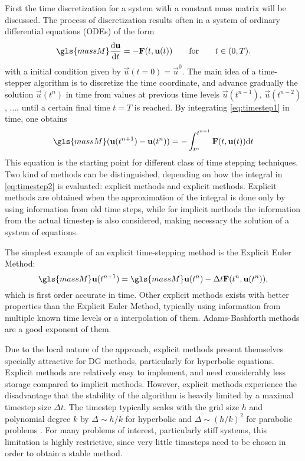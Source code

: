 First the time discretization for a system with a constant mass matrix will be discussed. The process of discretization results often in a system of ordinary differential equations (ODEs) of the form
\begin{equation}
\gls{massM}\frac{\text{d}\vec{u}}{\text{d}t} = - \vec{F}(t,\vec{u}(t))\qquad \text{for}\qquad t \in (0,T).\label{eq:timestep1}
\end{equation}
with a initial condition given by $\vec{u}(t=0) = \vec{u}^0$. The main idea of a time-stepper algorithm is to discretize the time coordinate, and advance gradually the solution $\vec{u}(t^n)$ in time from values at previous time levels $\vec{u}(t^{n-1})$, $\vec{u}(t^{n-2})$, $\dots$,  until a certain final time $t = T$ is reached.
By integrating \cref{eq:timestep1} in time, one obtains
\begin{equation}
\gls{massM}(\vec{u}(t^{n+1})-\vec{u}(t^{n})) = - \int_{t^n}^{t^{n+1}}\vec{F}(t,\vec{u}(t)) \text{d}t \label{eq:timestep2}
\end{equation}
This equation is the starting point for different class of time stepping techniques. Two kind of methods can be distinguished, depending on how the integral in \cref{eq:timestep2} is evaluated: explicit methods and explicit methods. Explicit methods are obtained when the approximation of the integral is done only by using information from old time steps, while for implicit methods the information from the actual timestep is also considered, making necessary the solution of a system of equations.

The simplest example of an explicit time-stepping method is the Explicit Euler Method:
\begin{equation}
\gls{massM}\vec{u}(t^{n+1})= \gls{massM}\vec{u}(t^{n})  - \Delta t \vec{F}(t^n,\vec{u}(t^n)),
\end{equation}
which is first order accurate in time. Other explicit methods exists with better properties than the Explicit Euler Method, typically using information from multiple known time levels or a interpolation of them. Adams-Bashforth methods are a good exponent of them. 

Due to the local nature of the approach, explicit methods present themselves specially attractive for DG methods, particularly for hyperbolic equations. Explicit methods are relatively easy to implement, and need considerably less storage compared to implicit methods. However, explicit methods experience the disadvantage that the stability of the algorithm is heavily limited by a maximal timestep size $\Delta t$. The timestep typically scales with the grid size $h$ and polynomial degree $k$ by $\Delta \sim h/k$ for hyperbolic and $\Delta \sim (h/k)^2$ for parabolic problems \parencite{gassnerContributionConstructionDiffusion2007}. For many problems of interest, particularly stiff systems, this limitation is highly restrictive, since very little timesteps need to be chosen in order to obtain a stable method. 

